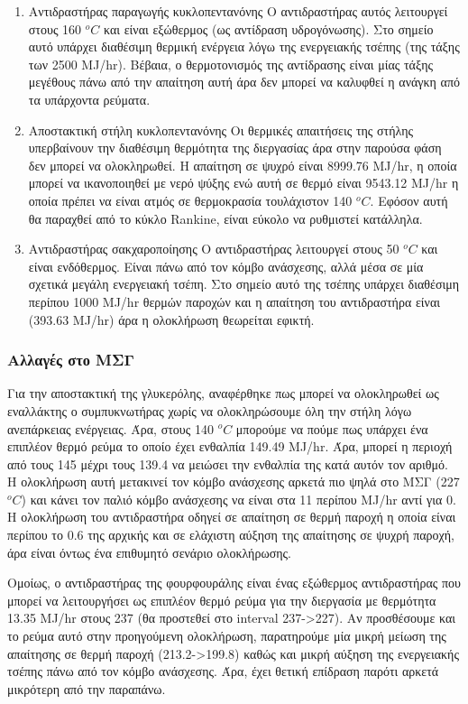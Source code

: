 \documentclass[11pt]{article}
\begin{document}
\begin{enumerate}
\item Αντιδραστήρας παραγωγής κυκλοπεντανόνης
\label{sec:orgef8e2d0}
Ο αντιδραστήρας αυτός λειτουργεί στους 160 \(^oC\) και είναι εξώθερμος (ως αντίδραση υδρογόνωσης). Στο σημείο αυτό υπάρχει διαθέσιμη θερμική ενέργεια λόγω της ενεργειακής τσέπης (της τάξης των 2500 MJ/hr). Βέβαια, ο θερμοτονισμός της αντίδρασης είναι μίας τάξης μεγέθους πάνω από την απαίτηση αυτή άρα δεν μπορεί να καλυφθεί η ανάγκη από τα υπάρχοντα ρεύματα.
\item Αποστακτική στήλη κυκλοπεντανόνης
\label{sec:orgfdbcfda}
Οι θερμικές απαιτήσεις της στήλης υπερβαίνουν την διαθέσιμη θερμότητα της διεργασίας άρα στην παρούσα φάση δεν μπορεί να ολοκληρωθεί. Η απαίτηση σε ψυχρό είναι 8999.76 MJ/hr, η οποία μπορεί να ικανοποιηθεί με νερό ψύξης ενώ αυτή σε θερμό είναι 9543.12 MJ/hr η οποία πρέπει να είναι ατμός σε θερμοκρασία τουλάχιστον 140 \(^oC\). Εφόσον αυτή θα παραχθεί από το κύκλο Rankine, είναι εύκολο να ρυθμιστεί κατάλληλα.
\item Αντιδραστήρας σακχαροποίησης
\label{sec:org5f5ce47}
Ο αντιδραστήρας λειτουργεί στους 50 \(^oC\) και είναι ενδόθερμος. Είναι πάνω από τον κόμβο ανάσχεσης, αλλά μέσα σε μία σχετικά μεγάλη ενεργειακή τσέπη. Στο σημείο αυτό της τσέπης υπάρχει διαθέσιμη περίπου 1000 MJ/hr θερμών παροχών και η απαίτηση του αντιδραστήρα είναι (393.63 MJ/hr) άρα η ολοκλήρωση θεωρείται εφικτή.
\end{enumerate}

\subsubsection{Αλλαγές στο ΜΣΓ}
\label{sec:org4b493a2}
Για την αποστακτική της γλυκερόλης, αναφέρθηκε πως μπορεί να ολοκληρωθεί ως εναλλάκτης ο συμπυκνωτήρας χωρίς να ολοκληρώσουμε όλη την στήλη λόγω ανεπάρκειας ενέργειας. Άρα, στους 140 \(^oC\) μπορούμε να πούμε πως υπάρχει ένα επιπλέον θερμό ρεύμα το οποίο έχει ενθαλπία 149.49 MJ/hr. Άρα, μπορεί η περιοχή από τους 145 μέχρι τους 139.4 να μειώσει την ενθαλπία της κατά αυτόν τον αριθμό. Η ολοκλήρωση αυτή μετακινεί τον κόμβο ανάσχεσης αρκετά πιο ψηλά στο ΜΣΓ (227 \(^oC\)) και κάνει τον παλιό κόμβο ανάσχεσης να είναι στα 11 περίπου MJ/hr αντί για 0. Η ολοκλήρωση του αντιδραστήρα οδηγεί σε απαίτηση σε θερμή παροχή η οποία είναι περίπου το 0.6 της αρχικής και σε ελάχιστη αύξηση της απαίτησης σε ψυχρή παροχή, άρα είναι όντως ένα επιθυμητό σενάριο ολοκλήρωσης.

Ομοίως, ο αντιδραστήρας της φουρφουράλης είναι ένας εξώθερμος αντιδραστήρας που μπορεί να λειτουργήσει ως επιπλέον θερμό ρεύμα για την διεργασία με θερμότητα 13.35 MJ/hr στους 237 (θα προστεθεί στο interval 237->227). Αν προσθέσουμε και το ρεύμα αυτό στην προηγούμενη ολοκλήρωση, παρατηρούμε μία μικρή μείωση της απαίτησης σε θερμή παροχή (213.2->199.8) καθώς και μικρή αύξηση της ενεργειακής τσέπης πάνω από τον κόμβο ανάσχεσης. Άρα, έχει θετική επίδραση παρότι αρκετά μικρότερη από την παραπάνω.
\end{document}
